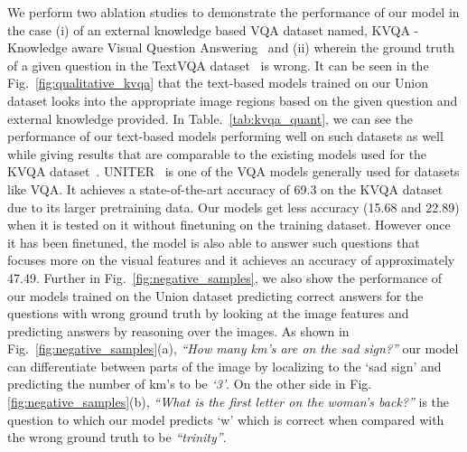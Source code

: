 \documentclass[10pt,twocolumn,letterpaper]{article}
\begin{document}
We perform two ablation studies to demonstrate the performance of our model in the case (i) of an external knowledge based VQA dataset named, KVQA - Knowledge aware Visual Question Answering~\cite{kvqa} and (ii) wherein the ground truth of a given question in the TextVQA dataset~\cite{textVQA} is wrong.
It can be seen in the Fig.~\ref{fig:qualitative_kvqa} that the text-based models trained on our Union dataset looks into the appropriate image regions based on the given question and external knowledge provided. 
In Table.~\ref{tab:kvqa_quant}, we can see the performance of our text-based models performing well on such datasets as well while giving results that are comparable to the existing models used for the KVQA dataset~\cite{kvqa}. UNITER~\cite{uniter_kvqa} is one of the VQA models generally used for datasets like VQA. It achieves a state-of-the-art accuracy of 69.3 on the KVQA dataset due to its larger pretraining data. Our models get less accuracy (15.68 and 22.89) when it is tested on it without finetuning on the training dataset. However once it has been finetuned, the model is also able to answer such questions that focuses more on the visual features and it achieves an accuracy of approximately 47.49. 
Further in Fig.~\ref{fig:negative_samples}, we also show the performance of our models trained on the Union dataset predicting correct answers for the questions with wrong ground truth by looking at the image features and predicting answers by reasoning over the images. As shown in Fig.~\ref{fig:negative_samples}(a), \textit{``How many km's are on the sad sign?''} our model can differentiate between parts of the image by localizing to the `sad sign' and predicting the number of km's to be \textit{`3'}. On the other side in Fig.\ref{fig:negative_samples}(b), \textit{``What is the first letter on the woman's back?''} is the question to which our model predicts `w' which is correct when compared with the wrong ground truth to be \textit{``trinity''}.




\end{document}
